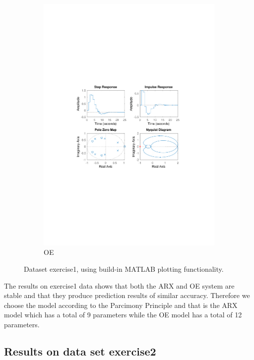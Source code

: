 \documentclass[]{article}
\begin{document}
\begin{figure}[ht]
\begin{subfigure}{.49\textwidth}
	\includegraphics[trim= 10cm 8cm 10cm 8cm, scale=0.4]{figures/3-OE-Ex1.pdf}
	\caption{OE}
	\label{fig:Ex1-OE}
\end{subfigure}
\caption{Dataset exercise1, using build-in MATLAB plotting functionality.}
\label{fig:Ex1}
\end{figure}

The results on exercise1 data shows that both the ARX and OE system are stable and that they produce prediction results of similar accuracy. Therefore we choose the model according to the Parcimony Principle and that is the ARX model which has a total of 9 parameters while the OE model has a total of 12 parameters.

\subsection{Results on data set exercise2}
\end{document}
